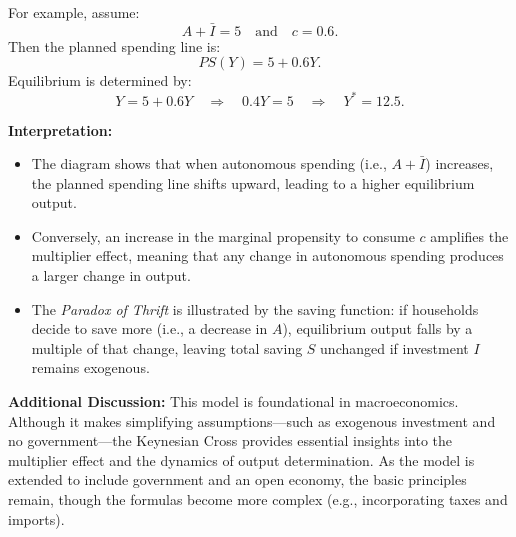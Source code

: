 For example, assume:
\[
A + \bar{I} = 5 \quad \text{and} \quad c = 0.6.
\]
Then the planned spending line is:
\[
PS(Y) = 5 + 0.6Y.
\]
Equilibrium is determined by:
\[
Y = 5 + 0.6Y \quad \Longrightarrow \quad 0.4Y = 5 \quad \Longrightarrow \quad Y^* = 12.5.
\]


\textbf{Interpretation:}
\begin{itemize}
    \item The diagram shows that when autonomous spending (i.e., \(A+\bar{I}\)) increases, the planned spending line shifts upward, leading to a higher equilibrium output.
    \item Conversely, an increase in the marginal propensity to consume \(c\) amplifies the multiplier effect, meaning that any change in autonomous spending produces a larger change in output.
    \item The \emph{Paradox of Thrift} is illustrated by the saving function: if households decide to save more (i.e., a decrease in \(A\)), equilibrium output falls by a multiple of that change, leaving total saving \(S\) unchanged if investment \(I\) remains exogenous.
\end{itemize}

\bigskip

\textbf{Additional Discussion:}
This model is foundational in macroeconomics. Although it makes simplifying assumptions—such as exogenous investment and no government—the Keynesian Cross provides essential insights into the multiplier effect and the dynamics of output determination. As the model is extended to include government and an open economy, the basic principles remain, though the formulas become more complex (e.g., incorporating taxes and imports).